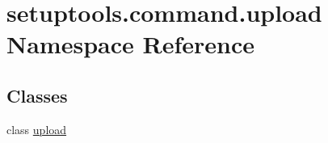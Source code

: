 \hypertarget{namespacesetuptools_1_1command_1_1upload}{}\section{setuptools.\+command.\+upload Namespace Reference}
\label{namespacesetuptools_1_1command_1_1upload}
\subsection*{Classes}
\begin{DoxyCompactItemize}
\item 
class \hyperlink{classsetuptools_1_1command_1_1upload_1_1upload}{upload}
\end{DoxyCompactItemize}
